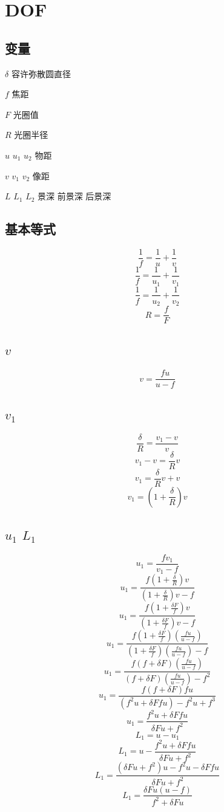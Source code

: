 \documentclass[12pt]{ctexart}
\begin{document}
\section{DOF}
\subsection{变量}
\(\delta\) 容许弥散圆直径

\(f\) 焦距

\(F\) 光圈值

\(R\) 光圈半径

\(u\) \(u_1\) \(u_2\) 物距

\(v\) \(v_1\) \(v_2\) 像距

\(L\) \(L_1\) \(L_2\) 景深 前景深 后景深


\subsection{基本等式}
\[\frac{1}{f}=\frac{1}{u}+\frac{1}{v}\]
\[\frac{1}{f}=\frac{1}{u_1}+\frac{1}{v_1}\]
\[\frac{1}{f}=\frac{1}{u_2}+\frac{1}{v_2}\]
\[R=\frac{f}{F}\]

\subsection[v]{\(v\)}
\[v=\frac{fu}{u-f}\]


\subsection[v1]{\(v_1\)}
\[\frac{\delta}{R}=\frac{v_1-v}{v}\]
\[v_1-v=\frac{\delta}{R}v\]
\[v_1=\frac{\delta}{R}v+v\]
\[v_1=(1+\frac{\delta}{R})v\]

\subsection[u1 L1]{\(u_1\) \(L_1\)}
\[u_1=\frac{fv_1}{v_1-f}\]
\[u_1=\frac{f(1+\frac{\delta}{R})v}{(1+\frac{\delta}{R})v-f}\]
\[u_1=\frac{f(1+\frac{\delta F}{f})v}{(1+\frac{\delta F}{f})v-f}\]
\[u_1=\frac{f(1+\frac{\delta F}{f})(\frac{fu}{u-f})}{(1+\frac{\delta F}{f})(\frac{fu}{u-f})-f}\]
\[u_1=\frac{f(f+\delta F)(\frac{fu}{u-f})}{(f+\delta F)(\frac{fu}{u-f})-f^2}\]
\[u_1=\frac{f(f+\delta F)fu}{(f^2u+\delta Ffu)-f^2u+f^3}\]
\[u_1=\frac{f^2u+\delta Ffu}{\delta Fu+f^2}\]
\[L_1=u-u_1\]
\[L_1=u-\frac{f^2u+\delta Ffu}{\delta Fu+f^2}\]
\[L_1=\frac{(\delta Fu+f^2)u-f^2u-\delta Ffu}{\delta Fu+f^2}\]
\[L_1=\frac{\delta Fu(u-f)}{f^2+\delta Fu}\]
\end{document}
